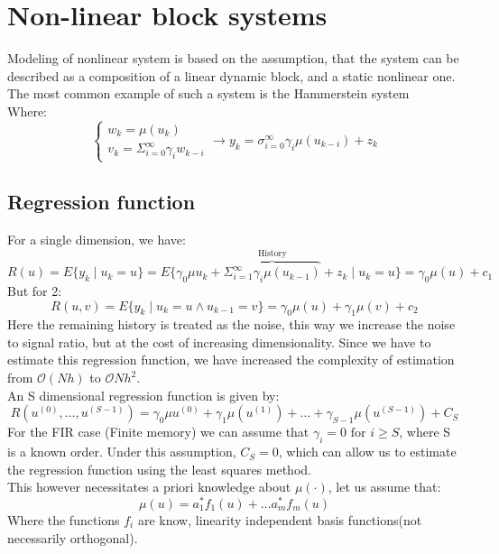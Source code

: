 

\chapter{Non-linear block systems}
Modeling of nonlinear system is based on the assumption, that
the system can be described as a composition of a linear dynamic block,
and a static nonlinear one. The most common example of such a system
is the Hammerstein system
\\
 
     Where:
     \begin{equation}
         \begin{cases}
             w_k = \mu(u_k)\\
             v_k = \Sigma_{i=0}^{\infty} \gamma_i w_{k-i}
         \end{cases} \rightarrow y_k = \sigma^{\infty}_{i=0}\gamma_i\mu(u_{k-i}) + z_k
     \end{equation}
 



\section{Regression function}
For a single dimension, we have:
\begin{equation}
    R(u) = E\{y_k \mid u_k = u\} = E\{\gamma_0\mu{u_k}+\overbrace{\Sigma_{i=1}^{\infty}\gamma_i\mu(u_{k-1})}^{\text{History}} + z_k \mid u_k = u \} = \gamma_0\mu(u) + c_1
\end{equation}
But for 2:
\begin{equation}
    R(u,v) = E\{y_k \mid u_k = u \wedge u_{k-1} = v \} = \gamma_0\mu(u) + \gamma_1\mu(v) + c_2
\end{equation}
Here the remaining history is treated as the noise, this way we increase the noise to signal ratio, but at the cost of increasing dimensionality. Since we have to estimate this regression function, we have increased the complexity of estimation from $\mathcal{O}(Nh)$ to $\mathcal{O}{Nh^{2}}$.\\
An S dimensional regression function is given by:
\begin{equation}
    R(u^{(0)},\dots,u^{(S-1)}) = \gamma_0\mu{u^{(0)}} + \gamma_1\mu(u^{(1)}) + \dots + \gamma_{S-1}\mu(u^{(S-1)}) + C_S
\end{equation}
For the FIR case (Finite memory) we can assume that $\gamma_i = 0 \text{ for } i \ge S$, where S is a known order. Under this assumption, $C_S = 0$, which can allow us to estimate the regression function using the least squares method.\\
This however necessitates a priori knowledge about  $\mu(\cdot)$, let us assume that:
 \begin{equation}
     \mu(u) = a_1^{*}f_1(u) + \dots a_m^{*}f_m(u)
 \end{equation}
 Where the functions $f_i$ are know, linearity independent basis functions(not necessarily orthogonal). 

